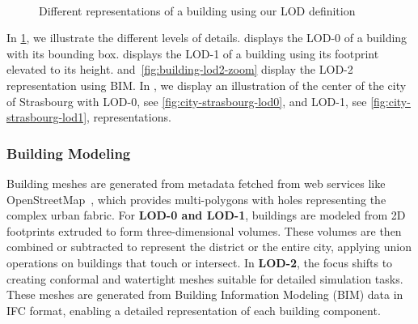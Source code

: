 \documentclass[runningheads]{llncs}
\begin{document}
\begin{figure}[ht]%
\centering
{}
\\ %

{}

\caption{Different representations of a building using our LOD definition}
\label{fig:buildings}

\end{figure}

In \cref{fig:buildings}, we illustrate the different levels of details. 
 displays the LOD-0 of a building with its bounding box. 
 displays the LOD-1 of a building using its footprint elevated to its height. 
 and~\cref{fig:building-lod2-zoom} display the LOD-2 representation using BIM. 
In , we display an illustration of the center of the city of Strasbourg with LOD-0, see \cref{fig:city-strasbourg-lod0}, and LOD-1, see \cref{fig:city-strasbourg-lod1}, representations.




\subsubsection{Building Modeling}
Building meshes are generated from metadata fetched from web services like OpenStreetMap~\cite{openstreetmap_contributors_planet_2017}, which provides multi-polygons with holes representing the complex urban fabric. For \textbf{LOD-0 and LOD-1}, buildings are modeled from 2D footprints extruded to form three-dimensional volumes. These volumes are then combined or subtracted to represent the district or the entire city, applying union operations on buildings that touch or intersect. In \textbf{LOD-2}, the focus shifts to creating conformal and watertight meshes suitable for detailed simulation tasks. These meshes are generated from Building Information Modeling (BIM) data in IFC format, enabling a detailed representation of each building component.
\end{document}
